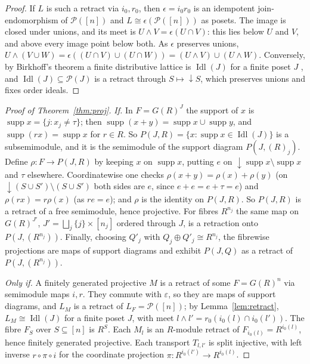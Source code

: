 \documentclass[11pt]{amsart}
\theoremstyle{remark}
\DeclareMathOperator{\Idl}{Idl}
\DeclareMathOperator{\supp}{supp}
\begin{document}
\begin{proof}
If $L$ is such a retract via $i_0,r_0$, then $\epsilon=i_0r_0$ is an idempotent join-endomorphism of $\mathcal P([n])$ and $L\cong\epsilon(\mathcal P([n]))$ as posets. The image is closed under unions, and its meet is $U\wedge V=\epsilon(U\cap V)$: this lies below $U$ and $V$, and above every image point below both. As $\epsilon$ preserves unions, $U\wedge(V\cup W)=\epsilon((U\cap V)\cup(U\cap W))=(U\wedge V)\cup(U\wedge W)$. Conversely, by Birkhoff's theorem a finite distributive lattice is $\Idl(J)$ for a finite poset $J$ \cite{Birkhoff}, and $\Idl(J)\subseteq\mathcal P(J)$ is a retract through $S\mapsto{\downarrow}S$, which preserves unions and fixes order ideals.
\end{proof}

\begin{proof}[Proof of Theorem~\ref{thm:proj}]
\emph{If.} In $F=G(R)^J$ the support of $x$ is $\supp x=\{j:x_j\ne\tau\}$; then $\supp(x+y)=\supp x\cup\supp y$, and $\supp(rx)=\supp x$ for $r\in R$. So $P(J,R)=\{x:\supp x\in\Idl(J)\}$ is a subsemimodule, and it is the semimodule of the support diagram $P(J,(R)_j)$. Define $\rho\colon F\to P(J,R)$ by keeping $x$ on $\supp x$, putting $e$ on ${\downarrow}\supp x\setminus\supp x$ and $\tau$ elsewhere. Coordinatewise one checks $\rho(x+y)=\rho(x)+\rho(y)$ (on ${\downarrow}(S\cup S')\setminus(S\cup S')$ both sides are $e$, since $e+e=e+\tau=e$) and $\rho(rx)=r\rho(x)$ (as $re=e$); and $\rho$ is the identity on $P(J,R)$. So $P(J,R)$ is a retract of a free semimodule, hence projective. For fibres $R^{n_j}$ the same map on $G(R)^{J'}$, $J'=\bigsqcup_j\{j\}\times[n_j]$ ordered through $J$, is a retraction onto $P(J,(R^{n_j}))$. Finally, choosing $Q'_j$ with $Q_j\oplus Q'_j\cong R^{n_j}$, the fibrewise projections are maps of support diagrams and exhibit $P(J,Q)$ as a retract of $P(J,(R^{n_j}))$.

\emph{Only if.} A finitely generated projective $M$ is a retract of some $F=G(R)^n$ via semimodule maps $i,r$. They commute with $\varepsilon$, so they are maps of support diagrams, and $L_M$ is a retract of $L_F=\mathcal P([n])$; by Lemma~\ref{lem:retract}, $L_M\cong\Idl(J)$ for a finite poset $J$, with meet $l\wedge l'=r_0(i_0(l)\cap i_0(l'))$. The fibre $F_S$ over $S\subseteq[n]$ is $R^S$. Each $M_l$ is an $R$-module retract of $F_{i_0(l)}=R^{i_0(l)}$, hence finitely generated projective. Each transport $T_{l,l'}$ is split injective, with left inverse $r\circ\pi\circ i$ for the coordinate projection $\pi\colon R^{i_0(l')}\to R^{i_0(l)}$.


\end{proof}
\end{document}

